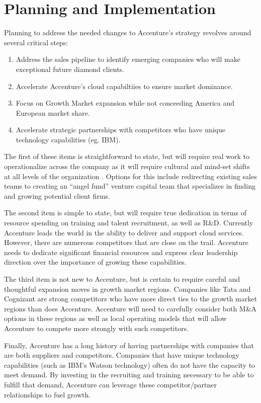 \section{Planning and Implementation}

Planning to address the needed changes to Accenture's strategy revolves around several critical steps:

 \begin{enumerate}
   \item Address the sales pipeline to identify emerging companies who will make exceptional future diamond clients.
   \item Accelerate Accenture's cloud capabiltiies to ensure market dominance.
   \item Focus on Growth Market expansion while not conceeding America and European market share.
   \item Accelerate strategic partnerships with competitors who have unique technology capabilities (eg. IBM).
 \end{enumerate}

The first of these items is straightforward to state, but will require real work to operationalize across the company as it will require cultural and mind-set shifts at all levels of the organization \parencite{adamidesLinkingOperationsStrategy2015a}. Options for this include redirecting existing sales teams to creating an ``angel fund'' venture capital team that specializes in finding and growing potential client firms.

The second item is simple to state, but will require true dedication in terms of resource spending on training and talent recruitment, as well as R\&D. Currently Accenture leads the world in the ability to deliver and support cloud services. However, there are numerous competitors that are close on the trail. Accenture needs to dedicate significant financial resources and express clear leadership direction over the importance of growing these capabilities.

The third item is not new to Accenture, but is certain to require careful and thoughtful expansion moves in growth market regions. Companies like Tata and Cognizant are strong competitors who have more direct ties to the growth market regions than does Accenture. Accenture will need to carefully consider both M\&A options in these regions as well as local operating models that will allow Accenture to compete more strongly with such competitors.

Finally, Accenture has a long history of having partnerships with companies that are both suppliers and competitors. Companies that have unique technology capabilities (such as IBM's Watson technology) often do not have the capacity to meet demand. By investing in the recruiting and training necessary to be able to fulfill that demand, Accenture can leverage these competitor/partner relationships to fuel growth.
